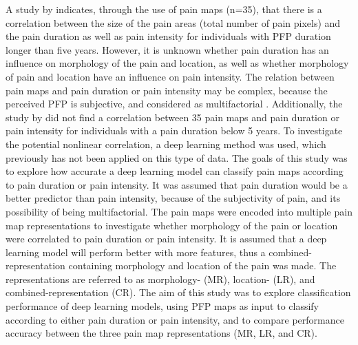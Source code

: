 \noindent
A study by \citeauthor{Boudreau2017} \citep{Boudreau2017} indicates, through the use of pain maps (n=35), that there is a correlation between the size of the pain areas (total number of pain pixels) and the pain duration as well as pain intensity for individuals with PFP duration longer than five years.\citep{Boudreau2017}
However, it is unknown whether pain duration has an influence on morphology of the pain and location, as well as whether morphology of pain and location have an influence on pain intensity.
The relation between pain maps and pain duration or pain intensity may be complex, because the perceived PFP is subjective, and considered as multifactorial \citep{Dansie2013}. Additionally, the study by \citeauthor{Boudreau2017} \citep{Boudreau2017} did not find a correlation between 35 pain maps and pain duration or pain intensity for individuals with a pain duration below 5 years. To investigate the potential nonlinear correlation, a deep learning method was used, which previously has not been applied on this type of data. \newline
\noindent
The goals of this study was to explore how accurate a deep learning model can classify pain maps according to pain duration or pain intensity. It was assumed that pain duration would be a better predictor than pain intensity, because of the subjectivity of pain, and its possibility of being multifactorial. 
The pain maps were encoded into multiple pain map representations to investigate whether morphology of the pain or location were correlated to pain duration or pain intensity.\newline
\noindent
It is assumed that a deep learning model will perform better with more features, thus a combined-representation containing morphology and location of the pain was made. The representations are referred to as morphology- (MR), location- (LR), and combined-representation (CR).
\noindent
The aim of this study was to explore classification performance of deep learning models, using PFP maps as input to classify according to either pain duration or pain intensity, and to compare performance accuracy between the three pain map representations (MR, LR, and CR).
